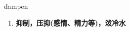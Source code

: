 
\begin{frame}
{\huge dampen}
\begin{center}
\begin{enumerate}\Large
  \item \textbf{抑制，压抑(感情、精力等)，泼冷水}
\end{enumerate}
\end{center}
\end{frame}
